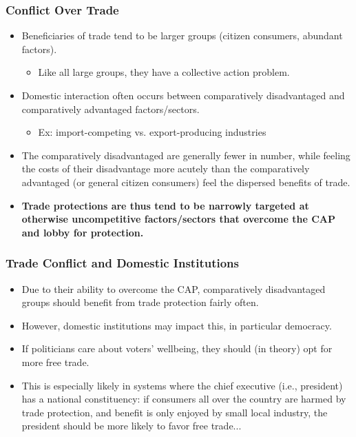 \documentclass[handout]{beamer}
\begin{document}
\begin{frame} 
	\frametitle{\LARGE Conflict Over Trade}
	\begin{itemize}
			\item Beneficiaries of trade tend to be larger groups (citizen consumers, abundant factors). \pause 
			\begin{itemize}
				\item Like all large groups, they have a collective action problem.
			\end{itemize}
			\item Domestic interaction often occurs between comparatively disadvantaged and comparatively advantaged factors/sectors. 
			\begin{itemize}
				\item Ex: import-competing vs. export-producing industries \pause 
			\end{itemize}
			\item The comparatively disadvantaged are generally fewer in number, while feeling the costs of their disadvantage more acutely than the comparatively advantaged (or general citizen consumers) feel the dispersed benefits of trade.  \pause 
			\item \textbf{Trade protections are thus tend to be narrowly targeted at otherwise uncompetitive factors/sectors that overcome the CAP and lobby for protection.}  
	\end{itemize}
\end{frame}

\begin{frame} 
	\frametitle{\LARGE Trade Conflict and Domestic Institutions}
	\begin{itemize}
		\item Due to their ability to overcome the CAP, comparatively disadvantaged groups should benefit from trade protection fairly often. \pause
		\item However, domestic institutions may impact this, in particular democracy. \pause
		\item If politicians care about voters' wellbeing, they should (in theory) opt for more free trade.
		\item This is especially likely in systems where the chief executive (i.e., president) has a national constituency: if consumers all over the country are harmed by trade protection, and benefit is only enjoyed by small local industry, the president should be more likely to favor free trade...
	\end{itemize}
\end{frame}
\end{document}
